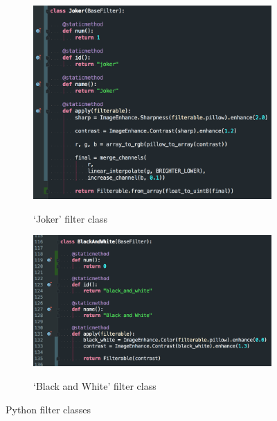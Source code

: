\documentclass[a4paper,12pt]{report}
\begin{document}
      \begin{figure}[h]
        \centering
        \begin{subfigure}[b]{0.47\textwidth}
          \centering
          \caption{‘Joker’ filter class}
          \includegraphics[width=\linewidth]{joker-filter-code}
          \label{fig:joker-filter-code}
        \end{subfigure}
        \begin{subfigure}[b]{0.47\textwidth}
          \centering
          \caption{‘Black and White’ filter class}
          \includegraphics[width=\linewidth]{black-and-white-filter-code}
          \label{fig:black-and-white-filter-code}
        \end{subfigure}
        \caption{Python filter classes}
        \label{fig:filter-code}
      \end{figure}
\end{document}
